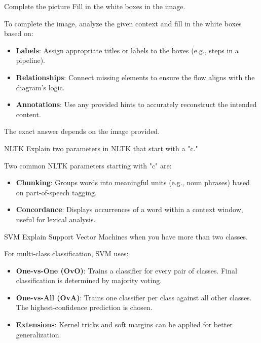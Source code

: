 \documentclass{article}
\begin{document}
\begin{exercise}{Complete the picture}
  Fill in the white boxes in the image.

  \begin{solution}
    To complete the image, analyze the given context and fill in the white boxes based on:
    \begin{itemize}
        \item \textbf{Labels}: Assign appropriate titles or labels to the boxes (e.g., steps in a pipeline).
        \item \textbf{Relationships}: Connect missing elements to ensure the flow aligns with the diagram's logic.
        \item \textbf{Annotations}: Use any provided hints to accurately reconstruct the intended content.
    \end{itemize}
    The exact answer depends on the image provided.
  \end{solution}
\end{exercise}

\begin{exercise}{NLTK}
  Explain two parameters in NLTK that start with a "c."

  \begin{solution}
    Two common NLTK parameters starting with "c" are:
    \begin{itemize}
        \item \textbf{Chunking}: Groups words into meaningful units (e.g., noun phrases) based on part-of-speech tagging.
        \item \textbf{Concordance}: Displays occurrences of a word within a context window, useful for lexical analysis.
    \end{itemize}
  \end{solution}
\end{exercise}

\begin{exercise}{SVM}
  Explain Support Vector Machines when you have more than two classes.

  \begin{solution}
    For multi-class classification, SVM uses:
    \begin{itemize}
        \item \textbf{One-vs-One (OvO)}: Trains a classifier for every pair of classes. Final classification is determined by majority voting.
        \item \textbf{One-vs-All (OvA)}: Trains one classifier per class against all other classes. The highest-confidence prediction is chosen.
        \item \textbf{Extensions}: Kernel tricks and soft margins can be applied for better generalization.
    \end{itemize}
  \end{solution}
\end{exercise}
\end{document}

